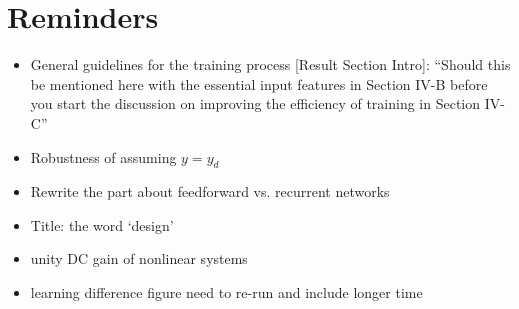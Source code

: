 \section*{Reminders}
\begin{itemize}
\item General guidelines for the training process [Result Section Intro]: ``Should this be mentioned here with the essential input features in Section  IV-B before you start the discussion on improving the efficiency of training in Section IV-C''
\item Robustness of assuming $y=y_d$
\item Rewrite the part about feedforward vs. recurrent networks
\item Title: the word `design'
\item unity DC gain of nonlinear systems
\item learning difference figure need to re-run and include longer time
\end{itemize}
